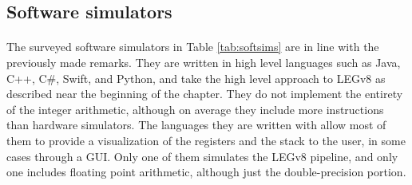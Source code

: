 \begin{landscape}
\begin{table}[H]
	\centering
	\caption{The surveyed hardware simulators}
        \label{tab:harsims}
\end{table}
\end{landscape}
\newpage

\subsection{Software simulators}
\paragraph{}
The surveyed software simulators in Table \ref{tab:softsims} are in line with the previously made remarks. They are written in high level languages such as Java, C++, C\#, Swift, and Python, and take the high level approach to LEGv8 as described near the beginning of the chapter. They do not implement the entirety of the integer arithmetic, although on average they include more instructions than hardware simulators. The languages they are written with allow most of them to provide a visualization of the registers and the stack to the user, in some cases through a GUI. Only one of them simulates the LEGv8 pipeline, and only one includes floating point arithmetic, although just the double-precision portion.


